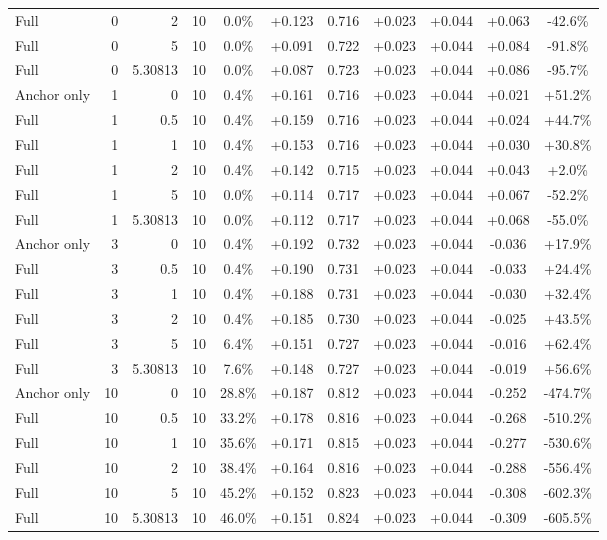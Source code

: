\begin{table}[htbp]
\begin{tabular}{lrrrccccccc}
Full & 0 & 2 & 10 & 0.0\% & +0.123 & 0.716 & +0.023 & +0.044 & +0.063 & -42.6\% \\
Full & 0 & 5 & 10 & 0.0\% & +0.091 & 0.722 & +0.023 & +0.044 & +0.084 & -91.8\% \\
Full & 0 & 5.30813 & 10 & 0.0\% & +0.087 & 0.723 & +0.023 & +0.044 & +0.086 & -95.7\% \\
Anchor only & 1 & 0 & 10 & 0.4\% & +0.161 & 0.716 & +0.023 & +0.044 & +0.021 & +51.2\% \\
Full & 1 & 0.5 & 10 & 0.4\% & +0.159 & 0.716 & +0.023 & +0.044 & +0.024 & +44.7\% \\
Full & 1 & 1 & 10 & 0.4\% & +0.153 & 0.716 & +0.023 & +0.044 & +0.030 & +30.8\% \\
Full & 1 & 2 & 10 & 0.4\% & +0.142 & 0.715 & +0.023 & +0.044 & +0.043 & +2.0\% \\
Full & 1 & 5 & 10 & 0.0\% & +0.114 & 0.717 & +0.023 & +0.044 & +0.067 & -52.2\% \\
Full & 1 & 5.30813 & 10 & 0.0\% & +0.112 & 0.717 & +0.023 & +0.044 & +0.068 & -55.0\% \\
Anchor only & 3 & 0 & 10 & 0.4\% & +0.192 & 0.732 & +0.023 & +0.044 & -0.036 & +17.9\% \\
Full & 3 & 0.5 & 10 & 0.4\% & +0.190 & 0.731 & +0.023 & +0.044 & -0.033 & +24.4\% \\
Full & 3 & 1 & 10 & 0.4\% & +0.188 & 0.731 & +0.023 & +0.044 & -0.030 & +32.4\% \\
Full & 3 & 2 & 10 & 0.4\% & +0.185 & 0.730 & +0.023 & +0.044 & -0.025 & +43.5\% \\
Full & 3 & 5 & 10 & 6.4\% & +0.151 & 0.727 & +0.023 & +0.044 & -0.016 & +62.4\% \\
Full & 3 & 5.30813 & 10 & 7.6\% & +0.148 & 0.727 & +0.023 & +0.044 & -0.019 & +56.6\% \\
Anchor only & 10 & 0 & 10 & 28.8\% & +0.187 & 0.812 & +0.023 & +0.044 & -0.252 & -474.7\% \\
Full & 10 & 0.5 & 10 & 33.2\% & +0.178 & 0.816 & +0.023 & +0.044 & -0.268 & -510.2\% \\
Full & 10 & 1 & 10 & 35.6\% & +0.171 & 0.815 & +0.023 & +0.044 & -0.277 & -530.6\% \\
Full & 10 & 2 & 10 & 38.4\% & +0.164 & 0.816 & +0.023 & +0.044 & -0.288 & -556.4\% \\
Full & 10 & 5 & 10 & 45.2\% & +0.152 & 0.823 & +0.023 & +0.044 & -0.308 & -602.3\% \\
Full & 10 & 5.30813 & 10 & 46.0\% & +0.151 & 0.824 & +0.023 & +0.044 & -0.309 & -605.5\% \\

\end{tabular}
\end{table}
